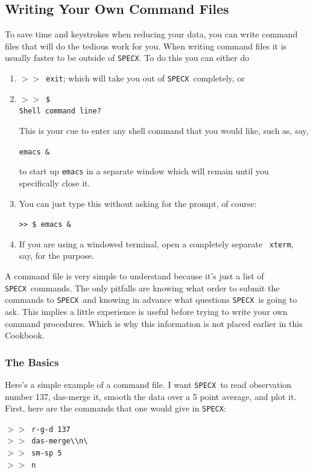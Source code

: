 \documentclass[11pt,twoside]{article}
\newcommand{\SPECX}{{\tt SPECX}}
\newcommand{\SP}{{$>\!>$}}
\begin{document}
\subsection{Writing Your Own Command Files}
\label{sec:specx_9}
To save time and keystrokes when reducing your data, you can write
command files that will do the tedious work for you.  When writing
command files it is usually faster to be outside of \SPECX . To do
this you can either do
\begin{enumerate}
\item
\SP\ \verb|exit|; which will take you out of \SPECX\ completely, or
\item
\SP\ \verb|$|\\
\verb|Shell command line?|

This is your cue to enter any shell command that you would like, such
as, say,

\verb|emacs &|

to start up {\tt emacs} in a separate window which will remain until
you specifically close it. 
\item 
You can just type this without asking for the prompt, of course:

\verb|>> $ emacs &|

\item
If you are using a windowed terminal, open a completely separate {\tt
xterm}, say, for the purpose.
\end{enumerate}

A command file is very simple to understand because it's just a list of 
\SPECX\ commands.  The only pitfalls are knowing what order to submit the 
commands to \SPECX\ and knowing in advance what questions \SPECX\ is
going to ask. This implies a little experience is useful before trying
to write your own command procedures. Which is why this information is
not placed earlier in this Cookbook.

\subsubsection{The Basics}
\label{sec:specx_9.1}
Here's a simple example of a command file.  I want \SPECX\ to read
observation number 137, das-merge it, smooth the data over a 5 point
average, and plot it.  First, here are the commands that one would
give in \SPECX :

\SP\ \verb|r-g-d 137| \\
\SP\ \verb|das-merge\\n\ | \\
\SP\ \verb|sm-sp 5| \\
\SP\ \verb|n|
\end{document}
